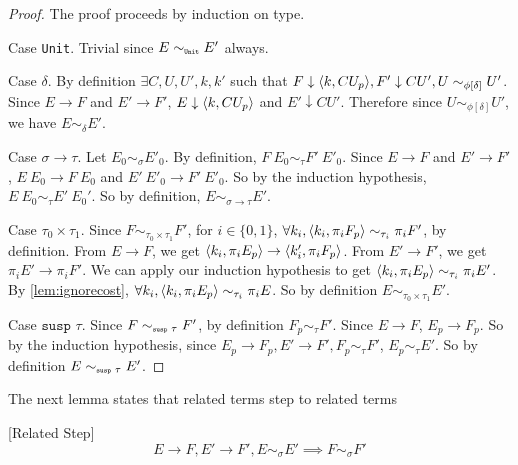 \begin{proof}
  The proof proceeds by induction on type.

  Case \texttt{Unit}. Trivial since $E \sim_{\texttt{\tiny{Unit}}} E'$ always.

  Case $\delta$.
  By definition $\exists C, U, U', k, k'$ such that $F \downarrow \langle k, C U_p \rangle, F' \downarrow C U', U \sim_{\phi[\delta]} U'$.
  Since $E \to F$ and $E' \to F'$, $E \downarrow \langle k, C U_p \rangle$ and $E' \downarrow C U'$.
  Therefore since $U \sim_{\phi[\delta]} U'$, we have $E \sim_\delta E'$.

  Case $\sigma \to \tau$.
  Let $E_0 \sim_\sigma E'_0$.
  By definition, $F\ E_0 \sim_\tau F'\ E'_0$.
  Since $E \to F$ and $E' \to F'$, $E\ E_0 \to F\ E_0$ and $E'\ E'_0 \to F'\ E'_0$.
  So by the induction hypothesis, $E\ E_0 \sim_\tau E'\ E_0'$.
  So by definition, $E \sim_{\sigma \to \tau} E'$.

  Case $\tau_0 \times \tau_1$.
  Since $F \sim_{\tau_0 \times \tau_1} F'$, for $i\in\{0, 1\}$,  $\forall k_i, \langle k_i, \pi_i F_p \rangle \sim_{\tau_i} \pi_i F'$, by definition.
  From $E \to F$, we get $\langle k_i, \pi_i E_p \rangle \to \langle k_i', \pi_i F_p \rangle$.
  From $E' \to F'$, we get $\pi_i E' \to \pi_i F'$.
  We can apply our induction hypothesis to get $\langle k_i, \pi_i E_p \rangle \sim_{\tau_i} \pi_i E'$.
  By \ref{lem:ignorecost}, $\forall k_i, \langle k_i, \pi_i E_p \rangle \sim_{\tau_i} \pi_i E$.
  So by definition $E \sim_{\tau_0 \times \tau_1} E'$.

  Case $\texttt{susp }\tau$.
  Since $F \sim_{\texttt{\tiny{susp }}\tau} F'$, by definition $F_p \sim_\tau F'$.
  Since $E \to F$, $E_p \to F_p$.
  So by the induction hypothesis, since $E_p \to F_p, E' \to F', F_p \sim_\tau F'$, $E_p \sim_\tau E'$.
  So by definition $E \sim_{\texttt{\tiny{susp }}\tau} E'$.

\end{proof}
%
The next lemma states that related terms step to related terms
%
\begin{lemma}
  \label{lem:relatedstep}[Related Step]
  \[ E \to F, E' \to F', E \sim_\sigma E' \implies F \sim_\sigma F' \]
\end{lemma}
%
